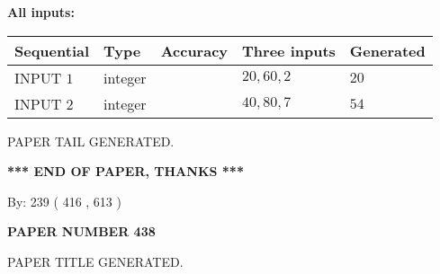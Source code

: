 \documentclass{ctexart}
\begin{document}
   
   
   
\noindent\vspace{0.1in}\hspace{-0.08in} {\textbf{\Large{All inputs: }}}
   
   
  
  
\noindent\begin{tabular}{|l|l|l|l|l|}
\hline
 Sequential & Type & Accuracy & Three inputs & Generated \\ 
\hline
 
 
  INPUT $  1 $ & integer &  & $
 20
 , 
 60
 , 
 2
 $ & $ 20 $ 
 \\  \hline  
 
 
  INPUT $  2 $ & integer &  & $
 40
 , 
 80
 , 
 7
 $ & $ 54 $ 
 \\  \hline  
 \end{tabular}
   
   
   
   
   
   
 \vspace{0.2in}
 
   
   
\vspace{2.0in} PAPER TAIL GENERATED.
   
   
   
   
\vspace{1.0in} 
{\textbf{\large{ *** END OF PAPER, THANKS *** }}} 
   
   
\hspace{1.0in} By: 
 239 ( 416 ,  613 )
   
   
   
   
\newpage 
\setcounter{page}{ 
   438001 } 
   
   
   
   
 {\textbf{ \Large{ PAPER NUMBER  438  }}}
   
   
\vspace{0.2in}
   
   
   
   
   
   
   
   
 \vspace{0.2in}
 
 
 
 
   
   
 PAPER TITLE GENERATED.
   
   
   
\vspace{0.2in}
   
\end{document}
